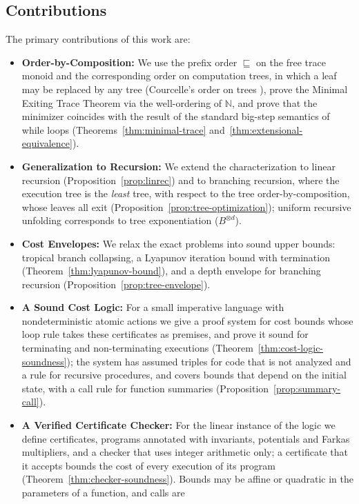 \documentclass[oneside,english]{amsart}
\numberwithin{equation}{section}
\numberwithin{figure}{section}
\theoremstyle{plain}
\theoremstyle{definition}
\theoremstyle{plain}
\theoremstyle{remark}
\theoremstyle{plain}
\theoremstyle{definition}
\theoremstyle{plain}
\theoremstyle{remark}
\begin{document}
\subsection*{Contributions}
The primary contributions of this work are:
\begin{itemize}
    \item \textbf{Order-by-Composition:} We use the prefix order $\sqsubseteq$ on the free trace monoid
    and the corresponding order on computation trees, in which a leaf may be replaced by any tree
    (Courcelle's order on trees \cite{courcelle1983trees}), prove the Minimal Exiting Trace Theorem via
    the well-ordering of $\mathbb{N}$, and prove that the minimizer coincides with the result of the standard
    big-step semantics of while loops (Theorems~\ref{thm:minimal-trace} and~\ref{thm:extensional-equivalence}).
    \item \textbf{Generalization to Recursion:} We extend the characterization to linear recursion
    (Proposition~\ref{prop:linrec}) and to branching recursion, where the execution tree is the \emph{least} tree, with respect to the
    tree order-by-composition, whose leaves all exit (Proposition~\ref{prop:tree-optimization}); uniform recursive
    unfolding corresponds to tree exponentiation ($B^{\otimes d}$).
    \item \textbf{Cost Envelopes:} We relax the exact problems into sound upper bounds: tropical branch collapsing,
    a Lyapunov iteration bound with termination (Theorem~\ref{thm:lyapunov-bound}), and a depth envelope for branching
    recursion (Proposition~\ref{prop:tree-envelope}).
    \item \textbf{A Sound Cost Logic:} For a small imperative language with nondeterministic atomic actions we give a
    proof system for cost bounds whose loop rule takes these certificates as premises, and prove it sound for
    terminating and non-terminating executions (Theorem~\ref{thm:cost-logic-soundness}); the system has assumed
    triples for code that is not analyzed and a rule for recursive procedures, and covers bounds that depend on the
    initial state, with a call rule for function summaries (Proposition~\ref{prop:summary-call}).
    \item \textbf{A Verified Certificate Checker:} For the linear instance of the logic we define certificates,
    programs annotated with invariants, potentials and Farkas multipliers, and a checker that uses integer
    arithmetic only; a certificate that it accepts bounds the cost of every execution of its program
    (Theorem~\ref{thm:checker-soundness}). Bounds may be affine or quadratic in the parameters of a function, and calls are

\end{itemize}
\end{document}
